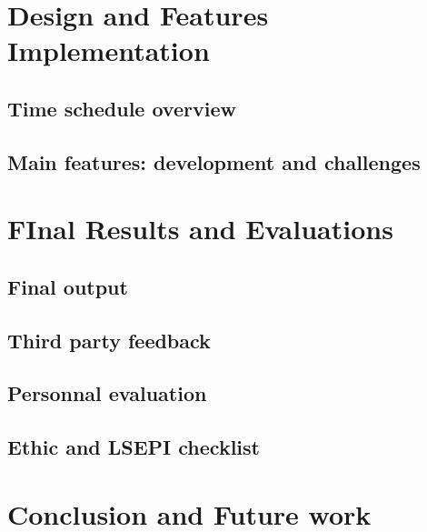 \documentclass[12pt,twoside]{article}
\begin{document}
\clearpage
\section{Design and Features Implementation}
\subsection{Time schedule overview}


\clearpage
\subsection{Main features: development and challenges}




\clearpage


\section{FInal Results and Evaluations}
\clearpage
\subsection{Final output}


\clearpage
\subsection{Third party feedback}


\clearpage
\subsection{Personnal evaluation}


\clearpage
\subsection{Ethic and LSEPI checklist}


\clearpage
\section{Conclusion and Future work}
\end{document}
